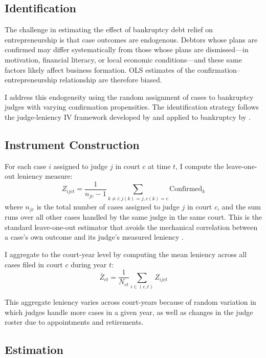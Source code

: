 \documentclass[12pt]{article}
\begin{document}
\subsection{Identification}

The challenge in estimating the effect of bankruptcy debt relief on entrepreneurship is that case outcomes are endogenous. Debtors whose plans are confirmed may differ systematically from those whose plans are dismissed---in motivation, financial literacy, or local economic conditions---and these same factors likely affect business formation. OLS estimates of the confirmation--entrepreneurship relationship are therefore biased.

I address this endogeneity using the random assignment of cases to bankruptcy judges with varying confirmation propensities. The identification strategy follows the judge-leniency IV framework developed by \citet{kling2006} and applied to bankruptcy by \citet{dobbie2015}.

\subsection{Instrument Construction}

For each case $i$ assigned to judge $j$ in court $c$ at time $t$, I compute the leave-one-out leniency measure:
\begin{equation}
Z_{ijct} = \frac{1}{n_{jc} - 1} \sum_{k \neq i: j(k)=j, c(k)=c} \text{Confirmed}_k
\label{eq:leniency}
\end{equation}
where $n_{jc}$ is the total number of cases assigned to judge $j$ in court $c$, and the sum runs over all other cases handled by the same judge in the same court. This is the standard leave-one-out estimator that avoids the mechanical correlation between a case's own outcome and its judge's measured leniency \citep{angrist1999}.

I aggregate to the court-year level by computing the mean leniency across all cases filed in court $c$ during year $t$:
\begin{equation}
\bar{Z}_{ct} = \frac{1}{N_{ct}} \sum_{i \in (c,t)} Z_{ijct}
\label{eq:agg_leniency}
\end{equation}

This aggregate leniency varies across court-years because of random variation in which judges handle more cases in a given year, as well as changes in the judge roster due to appointments and retirements.

\subsection{Estimation}
\end{document}
